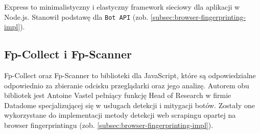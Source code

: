 Express to minimalistyczny i elastyczny framework sieciowy dla aplikacji w Node.js.
Stanowił podstawę dla \texttt{Bot API} (zob. \autoref{subsec:browser-fingerprinting-impl}).

\subsection{Fp-Collect i Fp-Scanner}\label{subsec:fp-scanner}

Fp-Collect oraz Fp-Scanner to biblioteki dla JavaScript, które są odpowiedzialne odpowiednio za zbieranie odcisku przeglądarki oraz jego analizę.
Autorem obu bibliotek jest Antoine Vastel pełniący funkcję Head of Research w firmie Datadome specjalizującej się w usługach detekcji i mitygacji botów.
Zostały one wykorzystane do implementacji metody detekcji web scrapingu opartej na browser fingerprintingu (zob. \autoref{subsec:browser-fingerprinting-impl}).